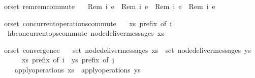 \begin{isabellebody}
\isamarkupfalse%
\ {\isacharparenleft}\ orset{\isacharparenright}\ rem{\isacharunderscore}rem{\isacharunderscore}commute{\isacharcolon}\isanewline
\ \ \ {\isachardoublequoteopen}{\isasymlangle}Rem\ i{}\ e{}{\isasymrangle}\ {\isasymrhd}\ {\isasymlangle}Rem\ i{}\ e{}{\isasymrangle}\ {\isacharequal}\ {\isasymlangle}Rem\ i{}\ e{}{\isasymrangle}\ {\isasymrhd}\ {\isasymlangle}Rem\ i{}\ e{}{\isasymrangle}{\isachardoublequoteclose}\isanewline
\end{isabellebody}

\begin{isabellebody}
\isamarkupfalse%
\ {\isacharparenleft}\ orset{\isacharparenright}\ concurrent{\isacharunderscore}operations{\isacharunderscore}commute{\isacharcolon}\isanewline
\ \ \ {\isachardoublequoteopen}xs\ prefix\ of\ i{\isachardoublequoteclose}\isanewline
\ \ \ {\isachardoublequoteopen}hb{\isachardot}concurrent{\isacharunderscore}ops{\isacharunderscore}commute\ {\isacharparenleft}node{\isacharunderscore}deliver{\isacharunderscore}messages\ xs{\isacharparenright}{\isachardoublequoteclose}\isanewline
\end{isabellebody}

\begin{isabellebody}
\isamarkupfalse%
\ {\isacharparenleft}\ orset{\isacharparenright}\ convergence{\isacharcolon}\isanewline
\ \ \ {\isachardoublequoteopen}set\ {\isacharparenleft}node{\isacharunderscore}deliver{\isacharunderscore}messages\ xs{\isacharparenright}\ {\isacharequal}\ set\ {\isacharparenleft}node{\isacharunderscore}deliver{\isacharunderscore}messages\ ys{\isacharparenright}{\isachardoublequoteclose}\isanewline
\ \ \ \ \ \ \ {\isachardoublequoteopen}xs\ prefix\ of\ i{\isachardoublequoteclose}\ \ {\isachardoublequoteopen}ys\ prefix\ of\ j{\isachardoublequoteclose}\isanewline
\ \ \ \ \ {\isachardoublequoteopen}apply{\isacharunderscore}operations\ xs\ {\isacharequal}\ apply{\isacharunderscore}operations\ ys{\isachardoublequoteclose}\isanewline
\end{isabellebody}